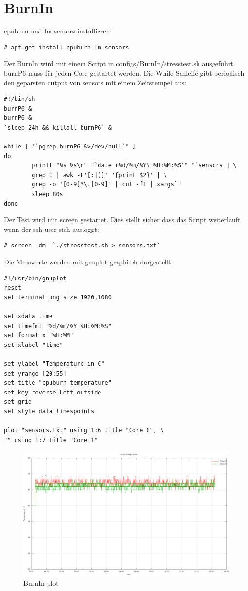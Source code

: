 \section{BurnIn}
cpuburn und lm-sensors installieren:
\begin{lstlisting}[style=Bash]
# apt-get install cpuburn lm-sensors
\end{lstlisting}
Der BurnIn wird mit einem Script in configs/BurnIn/stresstest.sh ausgeführt.\\
burnP6 muss für jeden Core gestartet werden. Die While Schleife gibt periodisch den geparsten output von sensors mit einem Zeitstempel aus:
\begin{lstlisting}[style=Bash]
#!/bin/sh
burnP6 &
burnP6 &
`sleep 24h && killall burnP6` &

while [ "`pgrep burnP6 &>/dev/null`" ]
do
        printf "%s %s\n" "`date +%d/%m/%Y\ %H:%M:%S`" "`sensors | \
		grep C | awk -F'[:|(]' '{print $2}' | \
		grep -o '[0-9]*\.[0-9]' | cut -f1 | xargs`"
        sleep 80s
done
\end{lstlisting}
Der Test wird mit screen gestartet. Dies stellt sicher dass das Script weiterläuft wenn der ssh-user sich ausloggt:
\begin{lstlisting}[style=Bash]
# screen -dm  `./stresstest.sh > sensors.txt`
\end{lstlisting}
Die Messwerte werden mit gnuplot graphisch dargestellt:
\begin{lstlisting}[style=Bash]
#!/usr/bin/gnuplot
reset
set terminal png size 1920,1080

set xdata time
set timefmt "%d/%m/%Y %H:%M:%S"
set format x "%H:%M"
set xlabel "time"

set ylabel "Temperature in C"
set yrange [20:55]
set title "cpuburn temperature"
set key reverse Left outside
set grid
set style data linespoints

plot "sensors.txt" using 1:6 title "Core 0", \
"" using 1:7 title "Core 1"
\end{lstlisting}
\newpage
\begin{figure}[H]
	\includegraphics[scale=0.27]{../aufgabe1/BurnIn/plot.png}
	\caption{BurnIn plot}
\end{figure}
